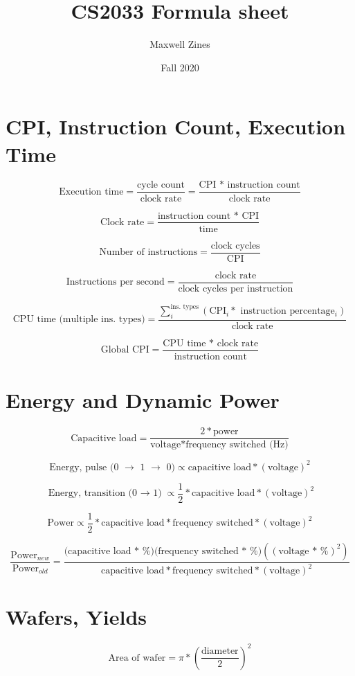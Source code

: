 \documentclass{article}
\title{CS2033 Formula sheet}
\author{Maxwell Zines}
\date{Fall 2020}
\begin{document}
\section{CPI, Instruction Count, Execution Time}

\[ \textrm{Execution time} = \frac{\textrm{cycle count}}{\textrm{clock rate}} = \frac{\textrm{CPI * instruction count}}{\textrm{clock rate}} \]

\[ \textrm{Clock rate} = \frac{\textrm{instruction count * CPI}}{\textrm{time}} \]

\[ \textrm{Number of instructions} = \frac{\textrm{clock cycles}}{\textrm{CPI}} \]

\[ \textrm{Instructions per second} = \frac{\textrm{clock rate}}{\textrm{clock cycles per instruction}} \]

\[ \mbox{CPU time (multiple ins. types)} = \frac{\sum\limits_{i}^{\textrm{ins. types}} \left( \mbox{CPI$_i$} * \mbox{ instruction percentage$_i$} \right)}{\mbox{clock rate}} \]

\[ \textrm{Global CPI} = \frac{\textrm{CPU time * clock rate}}{\textrm{instruction count}} \]

\section{Energy and Dynamic Power}

\[ \textrm{Capacitive load} = \frac{2 * \textrm{power}}{\textrm{voltage} * \textrm{frequency switched (Hz)}} \]

\[ \textrm{Energy, pulse (0 $\to$ 1 $\to$ 0)} \propto \textrm{capacitive load} * (\textrm{voltage})^2 \]

\[ \textrm{Energy, transition (0 $\to$ 1)} \propto \frac{1}{2} * \textrm{capacitive load} * (\textrm{voltage})^2 \]

\[ \textrm{Power} \propto \frac{1}{2} * \textrm{capacitive load} * \textrm{frequency switched} * (\textrm{voltage})^2 \]

\[ \frac{\textrm{Power$_{new}$}}{\textrm{Power$_{old}$}} = \frac{\textrm{(capacitive load * \%)} \textrm{(frequency switched * \%)} ((\textrm{voltage * \%})^2)}{ \textrm{capacitive load} * \textrm{frequency switched} * (\textrm{voltage})^2} \]

\section{Wafers, Yields}

\[ \textrm{Area of wafer} = \pi * \left( \frac{\textrm{diameter}}{2} \right)^2 \]
\end{document}
